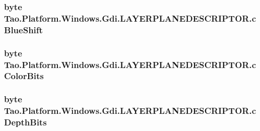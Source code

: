 \label{struct_tao_1_1_platform_1_1_windows_1_1_gdi_1_1_l_a_y_e_r_p_l_a_n_e_d_e_s_c_r_i_p_t_o_r_a7f1f070fbbd8b9af2e2a6cc1c888d7c3}
\hypertarget{struct_tao_1_1_platform_1_1_windows_1_1_gdi_1_1_l_a_y_e_r_p_l_a_n_e_d_e_s_c_r_i_p_t_o_r_a9ec3429e7ef40c779f649b17b9a75fa8}{
\subsubsection[{cBlueShift}]{\setlength{\rightskip}{0pt plus 5cm}byte {\bf Tao.Platform.Windows.Gdi.LAYERPLANEDESCRIPTOR.cBlueShift}}}
\label{struct_tao_1_1_platform_1_1_windows_1_1_gdi_1_1_l_a_y_e_r_p_l_a_n_e_d_e_s_c_r_i_p_t_o_r_a9ec3429e7ef40c779f649b17b9a75fa8}
\hypertarget{struct_tao_1_1_platform_1_1_windows_1_1_gdi_1_1_l_a_y_e_r_p_l_a_n_e_d_e_s_c_r_i_p_t_o_r_a40614e2801fcf164aa7ea7cde0f52900}{
\subsubsection[{cColorBits}]{\setlength{\rightskip}{0pt plus 5cm}byte {\bf Tao.Platform.Windows.Gdi.LAYERPLANEDESCRIPTOR.cColorBits}}}
\label{struct_tao_1_1_platform_1_1_windows_1_1_gdi_1_1_l_a_y_e_r_p_l_a_n_e_d_e_s_c_r_i_p_t_o_r_a40614e2801fcf164aa7ea7cde0f52900}
\hypertarget{struct_tao_1_1_platform_1_1_windows_1_1_gdi_1_1_l_a_y_e_r_p_l_a_n_e_d_e_s_c_r_i_p_t_o_r_ae566dd51869daf5805abad553a4d88ef}{
\subsubsection[{cDepthBits}]{\setlength{\rightskip}{0pt plus 5cm}byte {\bf Tao.Platform.Windows.Gdi.LAYERPLANEDESCRIPTOR.cDepthBits}}}
\label{struct_tao_1_1_platform_1_1_windows_1_1_gdi_1_1_l_a_y_e_r_p_l_a_n_e_d_e_s_c_r_i_p_t_o_r_ae566dd51869daf5805abad553a4d88ef}
